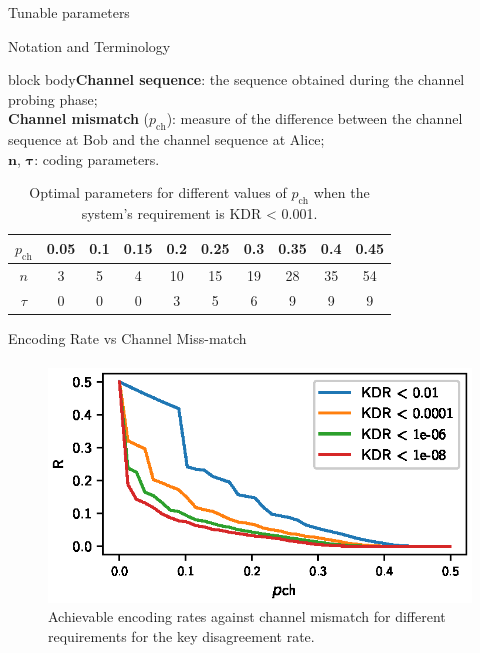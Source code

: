 \begin{frame}{Tunable parameters}
\begin{block}{Notation and Terminology}
\begin{beamercolorbox}[rounded=true]{block body}\textbf{Channel sequence}: the sequence obtained during the channel probing phase; \\
\textbf{Channel mismatch} ($p_{\text{ch}}$): measure of the difference between the channel sequence at Bob and the channel sequence at Alice;\\
$\mathbf{n}$, $\mathbf{\tau}$: coding parameters.
\end{beamercolorbox}
\end{block}

\begin{table}
    \centering
    \begin{tabular}{|c||ccccccccc|}
        \hline
       $p_{\text{ch}}$  & 0.05 & 0.1& 0.15&0.2 &0.25&0.3 &0.35&0.4 &0.45\\
        \hline
         \hline
       $n$ & 3& 5& 4 & 10& 15& 19& 28 &35& 54\\
        \hline
       $\tau$ & 0 & 0 & 0& 3 & 5& 6& 9& 9& 9 \\
        \hline
    \end{tabular}
    \caption{Optimal parameters for different values of $p_{\text{ch}}$ when the system's requirement is KDR < 0.001.}
    \label{tab: optimal}
\end{table}
\end{frame}

\begin{frame}{Encoding Rate vs Channel Miss-match}
\framesubtitle{}

\begin{figure}
    \centering
    \includegraphics[scale = 0.9]{figures/Cricket/optimal_param.eps}
    \caption{Achievable encoding rates against channel mismatch for different requirements for the key disagreement rate.}
    \label{fig:acheivable rates}
    \end{figure}
\end{frame}

